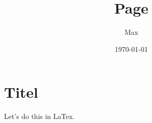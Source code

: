 \documentclass[12pt]{article}
\title{Page}
\author{Max}  %
\date{\today}
\begin{document}
\fancyhf{}  %
\fancyhead[r]{\leftmark}  %
\fancyfoot[C]{\thepage}  %

\section*{Titel}
Let's do this in LaTex.
\end{document}
